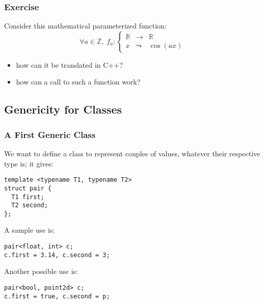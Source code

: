 \documentclass{beamer}
\newcommand{\cpp}{{C++}\xspace}
\begin{document}
\begin{frame}
  \frametitle{Exercise}

Consider this mathematical parameterized function:
$$
\forall a \in \mathbb{Z}, \;
f_a: \left\{
  \begin{array}{lll}
    \mathbb{R} &\rightarrow & \mathbb{R} \\
    x & \leadsto & \cos(a x)
  \end{array}
\right.
$$

\begin{itemize}
\item how can it be translated in \cpp?
\item how can a call to such a function work?
\end{itemize}

\end{frame}



\subsection{Genericity for Classes}


\begin{frame}[fragile]
  \frametitle{A First Generic Class}

  We want to define a class to represent couples of values, whatever
  their respective type is; it gives:

\begin{lstlisting}
template <typename T1, typename T2>
struct pair {
  T1 first;
  T2 second;
};
\end{lstlisting}

\smallskip

A sample use is:
\begin{lstlisting}
pair<float, int> c;
c.first = 3.14, c.second = 3; 
\end{lstlisting}

Another possible use is:
\begin{lstlisting}
pair<bool, point2d> c;
c.first = true, c.second = p; 
\end{lstlisting}

\end{frame}
\end{document}
